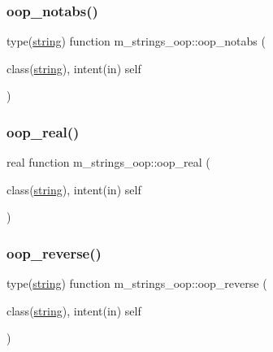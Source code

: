 \mbox{\label{namespacem__strings__oop_a5959b2f967a6466c198b39a089ef8a68}} 
\subsubsection{\texorpdfstring{oop\+\_\+notabs()}{oop\_notabs()}}
{\footnotesize\ttfamily type(\mbox{\hyperlink{structm__strings__oop_1_1string}{string}}) function m\+\_\+strings\+\_\+oop\+::oop\+\_\+notabs (\begin{DoxyParamCaption}\item[{class(\mbox{\hyperlink{structm__strings__oop_1_1string}{string}}), intent(in)}]{self }\end{DoxyParamCaption})\hspace{0.3cm}{\ttfamily [private]}}

\mbox{\label{namespacem__strings__oop_a9709a714bc825704651b00c7384a7547}} 
\subsubsection{\texorpdfstring{oop\+\_\+real()}{oop\_real()}}
{\footnotesize\ttfamily real function m\+\_\+strings\+\_\+oop\+::oop\+\_\+real (\begin{DoxyParamCaption}\item[{class(\mbox{\hyperlink{structm__strings__oop_1_1string}{string}}), intent(in)}]{self }\end{DoxyParamCaption})\hspace{0.3cm}{\ttfamily [private]}}

\mbox{\label{namespacem__strings__oop_ac3ab62e14d0b8445f51e084b810e2f76}} 
\subsubsection{\texorpdfstring{oop\+\_\+reverse()}{oop\_reverse()}}
{\footnotesize\ttfamily type(\mbox{\hyperlink{structm__strings__oop_1_1string}{string}}) function m\+\_\+strings\+\_\+oop\+::oop\+\_\+reverse (\begin{DoxyParamCaption}\item[{class(\mbox{\hyperlink{structm__strings__oop_1_1string}{string}}), intent(in)}]{self }\end{DoxyParamCaption})\hspace{0.3cm}{\ttfamily [private]}}

